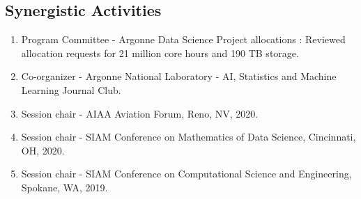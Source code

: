 \documentclass[11pt]{article}
\begin{document}
\subsection*{Synergistic Activities}
\begin{enumerate}
\parskip = -2pt
%
\item Program Committee - Argonne Data Science Project allocations : Reviewed allocation requests for 21 million core hours and 190 TB storage.
\item Co-organizer - Argonne National Laboratory - AI, Statistics and Machine Learning Journal Club.
\item Session chair - AIAA Aviation Forum, Reno, NV, 2020.
\item Session chair - SIAM Conference on Mathematics of Data Science, Cincinnati, OH, 2020.
\item Session chair - SIAM Conference on Computational Science and Engineering, Spokane, WA, 2019.
\end{enumerate}
\end{document}
